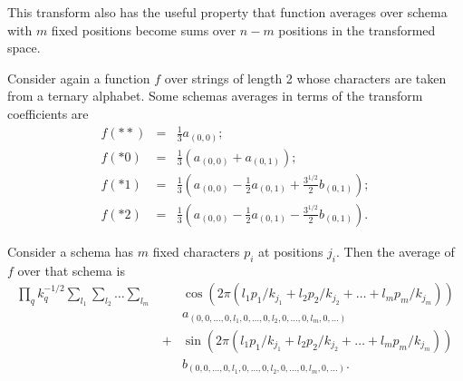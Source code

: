 This transform also has the useful property that function averages over schema
with $m$ fixed positions become sums over $n-m$ positions in the transformed
space.
\begin{example}
Consider again a function $f$ over strings of
length 2 whose characters are taken from a ternary alphabet.  Some schemas
averages in terms of the transform coefficients are
\begin{eqnarray}
f(**) &=& \frac{1}{3} a_{(0,0)}; \nonumber \\
f(*0) &=& \frac{1}{3} (a_{(0,0)} + a_{(0,1)}); \nonumber\\
f(*1) &=& \frac{1}{3} (a_{(0,0)} -\frac{1}{2} a_{(0,1)} +\frac{3^{1/2}}{2} b_{(0
,1)}); \nonumber\\
f(*2) &=& \frac{1}{3} (a_{(0,0)} -\frac{1}{2} a_{(0,1)} -\frac{3^{1/2}}{2} b_{(0
,1)}).
\end{eqnarray}
\end{example}


\begin{theorem}
Consider a schema has $m$ fixed characters $p_i$ at positions $j_i$.
Then the average of $f$ over that schema is
\begin{eqnarray}
\prod_q{k_q^{-1/2}}
\sum_{l_1} \sum_{l_2} \ldots \sum_{l_m} & &
\cos(2 \pi (l_1 p_1/k_{j_1}+l_2 p_2/k_{j_2} +\ldots+l_m p_m/k_{j_m}))\nonumber\\
&& a_{(0,0,\ldots,0,l_1,0,\ldots,0,l_2,0,\ldots,0,l_m,0,\ldots)}\nonumber\\
&+&
\sin(2 \pi (l_1 p_1/k_{j_1}+l_2 p_2/k_{j_2} +\ldots+l_m p_m/k_{j_m}))\nonumber\\
&& b_{(0,0,\ldots,0,l_1,0,\ldots,0,l_2,0,\ldots,0,l_m,0,\ldots)}.
\end{eqnarray}
\end{theorem}


